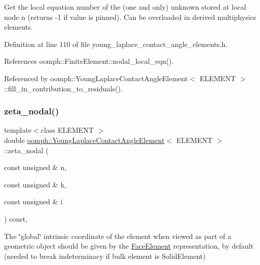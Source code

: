 Get the local equation number of the (one and only) unknown stored at local node n (returns -\/1 if value is pinned). Can be overloaded in derived multiphysics elements. 



Definition at line 110 of file young\+\_\+laplace\+\_\+contact\+\_\+angle\+\_\+elements.\+h.



References oomph\+::\+Finite\+Element\+::nodal\+\_\+local\+\_\+eqn().



Referenced by oomph\+::\+Young\+Laplace\+Contact\+Angle\+Element$<$ E\+L\+E\+M\+E\+N\+T $>$\+::fill\+\_\+in\+\_\+contribution\+\_\+to\+\_\+residuals().

\mbox{\label{classoomph_1_1YoungLaplaceContactAngleElement_ac6e3f26da35682eb715693755b661a5c}} 
\subsubsection{\texorpdfstring{zeta\+\_\+nodal()}{zeta\_nodal()}}
{\footnotesize\ttfamily template$<$class E\+L\+E\+M\+E\+NT $>$ \\
double \hyperlink{classoomph_1_1YoungLaplaceContactAngleElement}{oomph\+::\+Young\+Laplace\+Contact\+Angle\+Element}$<$ E\+L\+E\+M\+E\+NT $>$\+::zeta\+\_\+nodal (\begin{DoxyParamCaption}\item[{const unsigned \&}]{n,  }\item[{const unsigned \&}]{k,  }\item[{const unsigned \&}]{i }\end{DoxyParamCaption}) const\hspace{0.3cm}{\ttfamily [inline]}, {\ttfamily [virtual]}}



The \char`\"{}global\char`\"{} intrinsic coordinate of the element when viewed as part of a geometric object should be given by the \hyperlink{classoomph_1_1FaceElement}{Face\+Element} representation, by default (needed to break indeterminacy if bulk element is Solid\+Element) 

